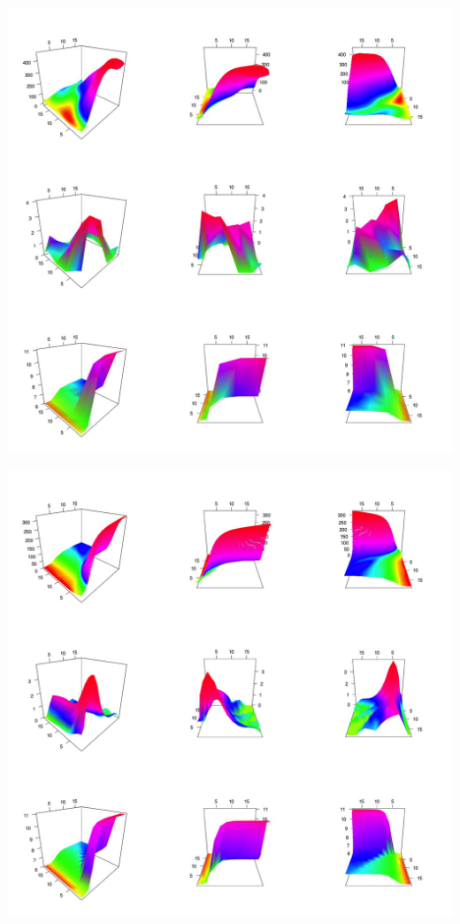 \documentclass[12pt]{article}
\begin{document}
\includegraphics{plot_cai_6_6_eqm}

\includegraphics{plot_ann_18_eqm}
\end{document}
